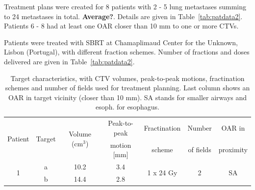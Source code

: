 \documentclass[type=dr, dr=rernat, accentcolor=tud7b,colorbacktitle, bigchapter, openright, twoside, 12pt ]{tudthesis}
\begin{document}
Treatment plans were created for 8 patients with 2 - 5 lung metastases summing to 24 metastases in total. \textbf{Average?}. Details are given in Table~\ref{tab:patdata2}.
Patients 6 - 8 had at least one OAR closer than 10 mm to one or more CTVs. 

Patients were treated with SBRT at Chamaplimaud Center for the Unknown, Lisbon (Portugal), with different fraction schemes. Number of fractions and doses delivered are given in Table~\ref{tab:patdata2}. 

\begin{table}[H]
	\centering
	\caption{Target characteristics, with CTV volumes, peak-to-peak motions, fractination schemes and number of fields used for treatment planning. Last column 
	shows an OAR in target vicinity (closer than 10 mm). SA stands for smaller airways and esoph. for esophagus.}
	\begin{tabular}{c|c|c|c|c|c|c}
		\hline\hline
		\multirow{2}{*}{Patient} & \multirow{2}{*}{Target} & \multirow{2}{*}{Volume (cm$^3$)} & Peak-to-peak & Fractination & Number & OAR in \\
		 & & & motion [mm] & scheme & of fields & proximity \\
		\hline
		\multirow{2}{*}{1} & a & 10.2 & 3.4  & \multirow{2}{*}{1 x 24 Gy} & \multirow{2}{*}{2} & \multirow{2}{*}{SA} \\
		 & b & 14.4 & 2.8 &  &  &  \\
		 

\end{tabular}
\end{table}
\end{document}
